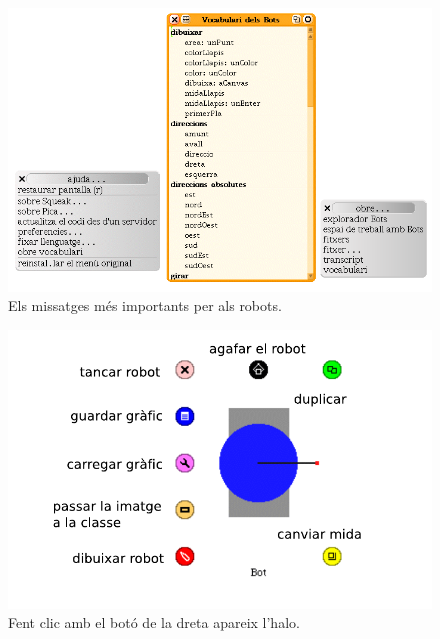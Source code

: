 \newpage

\begin{figure}[h!]
\begin{center}
\includegraphics[scale=2]{Imatges/figura5-3.png}
\end{center}
\caption{Els missatges més importants per als robots.}
\label{fig0503}
\end{figure}

\begin{figure}[h!]
\begin{center}
\includegraphics[scale=0.5]{Imatges/figura5-4}
\end{center}
\caption{Fent clic amb el botó de la dreta apareix l'halo.}
\label{fig0504}
\end{figure}

\newpage


